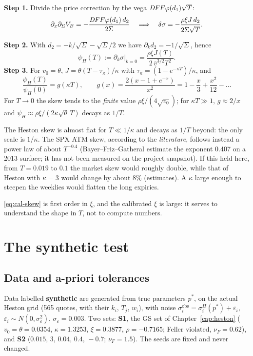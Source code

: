 \noindent\textbf{Step 1.} Divide the price correction by the vega $\mathit{DF} F\varphi(d_1)\sqrt T$:
\[
\partial_x\partial_\Sigma V_B=-\frac{\mathit{DF} F\varphi(d_1)\,d_2}{2\Sigma}
\quad\Longrightarrow\quad
\delta\sigma=-\frac{\rho\xi J\,d_2}{2\Sigma\sqrt T}.
\]

\noindent\textbf{Step 2.} With $d_2=-k/\sqrt\Sigma-\sqrt\Sigma/2$ we have $\partial_kd_2=-1/\sqrt\Sigma$, hence
\begin{equation}\label{eq:cal-skew}
\psi_H(T):=\partial_k\sigma\big|_{k=0}=\frac{\rho\xi J(T)}{2\,\bar v^{3/2}T^2}.
\end{equation}
\noindent\textbf{Step 3.} For $v_0=\theta$, $J=\theta(T-\tau_\kappa)/\kappa$ with
$\tau_\kappa=(1-e^{-\kappa T})/\kappa$, and
\begin{equation}\label{eq:cal-g}
\frac{\psi_H(T)}{\psi_H(0)}=g(\kappa T),\qquad g(x)=\frac{2(x-1+e^{-x})}{x^2}=1-\frac x3+\frac{x^2}{12}-\dots
\end{equation}
For $T\to0$ the skew tends to the \emph{finite} value $\rho\xi/(4\sqrt{v_0})$; for $\kappa T\gg1$, $g\approx2/x$ and
$\psi_H\approx\rho\xi/(2\kappa\sqrt\theta\,T)$ decays as $1/T$.

\begin{idea}[title={Key idea: Heston has a single clock}]
The Heston skew is almost flat for $T\ll1/\kappa$ and decays as $1/T$ beyond: the only scale is $1/\kappa$. The SPX ATM
skew, according to the \emph{literature}, follows instead a power law of about $T^{-0.4}$ (Bayer--Friz--Gatheral
estimate the exponent 0.407 on a 2013 surface; it has not been measured on the project snapshot). If this held here,
from $T=0.019$ to $0.1$ the market skew would roughly double, while that of Heston with $\kappa=3$ would change by about
8\% (estimates). A $\kappa$ large enough to steepen the weeklies would flatten the long expiries.
\end{idea}
\eqref{eq:cal-skew} is first order in $\xi$, and the calibrated $\xi$ is large: it serves to understand the shape in
$T$, not to compute numbers.

\section{The synthetic test}
\subsection{Data and a-priori tolerances}
Data labelled \textbf{synthetic} are generated from true parameters $p^*$, on the actual Heston grid (565 quotes, with
their $k_i$, $T_j$, $w_i$), with noise $\sigma^{\mathrm{obs}}_i=\sigma^H_i(p^*)+\varepsilon_i$,
$\varepsilon_i\sim N(0,\sigma_\varepsilon^2)$, $\sigma_\varepsilon=0.003$. Two sets: \textbf{S1}, the GS set of
Chapter~\ref{cap:heston} ($v_0=\theta=0.0354$, $\kappa=1.3253$, $\xi=0.3877$, $\rho=-0.7165$; Feller violated,
$\nu_F=0.62$), and \textbf{S2} ($0.015,\,3,\,0.04,\,0.4,\,-0.7$; $\nu_F=1.5$). The seeds are fixed and never changed.

